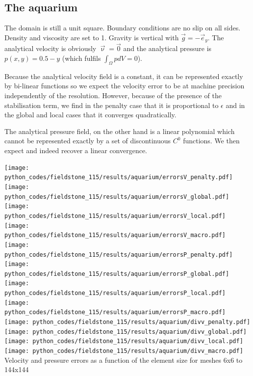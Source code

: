 \subsection*{The aquarium}

The domain is still a unit square. Boundary conditions are no slip on all sides. 
Density and viscosity are set to 1. Gravity is vertical with $\vec{g}=-\vec{e}_y$.
The analytical velocity is obviously $\vec\upnu=\vec{0}$ and the analytical pressure
is $p(x,y)=0.5-y$ (which fulfils $\int_\Omega p dV=0$).

Because the analytical velocity field is a constant, it can be represented exactly 
by bi-linear functions so we expect the velocity error to be at machine precision
independently of the resolution. However, because of the presence of the stabilisation
term, we find in the penalty case that it is proportional to $\epsilon$ and 
in the global and local cases that it converges quadratically.

The analytical pressure field, on the other hand is a linear polynomial which cannot 
be represented exactly by a set of discontinuous $C^0$ functions. We then expect and 
indeed recover a linear convergence.


\begin{center}
\texttt{[image: python\_codes/fieldstone\_115/results/aquarium/errorsV\_penalty.pdf]}
\texttt{[image: python\_codes/fieldstone\_115/results/aquarium/errorsV\_global.pdf]}
\texttt{[image: python\_codes/fieldstone\_115/results/aquarium/errorsV\_local.pdf]}
\texttt{[image: python\_codes/fieldstone\_115/results/aquarium/errorsV\_macro.pdf]}\\
\texttt{[image: python\_codes/fieldstone\_115/results/aquarium/errorsP\_penalty.pdf]}
\texttt{[image: python\_codes/fieldstone\_115/results/aquarium/errorsP\_global.pdf]}
\texttt{[image: python\_codes/fieldstone\_115/results/aquarium/errorsP\_local.pdf]}
\texttt{[image: python\_codes/fieldstone\_115/results/aquarium/errorsP\_macro.pdf]}\\
\texttt{[image: python\_codes/fieldstone\_115/results/aquarium/divv\_penalty.pdf]}
\texttt{[image: python\_codes/fieldstone\_115/results/aquarium/divv\_global.pdf]}
\texttt{[image: python\_codes/fieldstone\_115/results/aquarium/divv\_local.pdf]}
\texttt{[image: python\_codes/fieldstone\_115/results/aquarium/divv\_macro.pdf]}\\
{\captionfont Velocity and pressure errors as a function of the element size for meshes 6x6 to 144x144}
\end{center}


